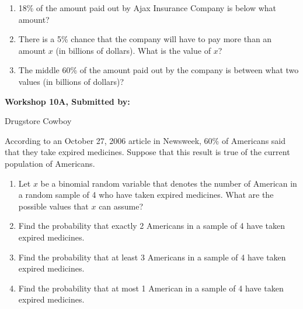 \documentclass[11pt]{book}\usepackage[]{graphicx}\usepackage[]{color}
\begin{document}
\begin{exercises}
\begin{exercise}
\begin{enumerate}
  \item 18\% of the amount paid out by Ajax Insurance Company is below what amount?
  \item There is a 5\% chance that the company will have to pay more than an amount $x$ (in billions of dollars). What is the value of $x$?
  \item The middle 60\% of the amount paid out by the company is between what two values (in billions of dollars)?
\end{enumerate}

\end{exercise}
\begin{solution}  %

\end{solution}

\clearpage

    \begin{exercise}  %

    \begin{center}
\begin{flushleft}\textbf{\large \hfill Workshop 10A, Submitted by: }\end{flushleft}

\end{center}

Drugstore Cowboy

According to an October 27, 2006 article in Newsweek, 60\% of Americans said that they take expired medicines. Suppose that this result is true of the current population of Americans.

\begin{enumerate}
\item Let $x$ be a binomial random variable that denotes the number of American in a random sample of 4 who have taken expired medicines. What are the possible values that $x$ can assume?
\item Find the probability that exactly 2 Americans in a sample of 4 have taken expired medicines.
\item Find the probability that at least 3 Americans in a sample of 4 have taken expired medicines.
\item Find the probability that at most 1 American in a sample of 4 have taken expired medicines.
\end{enumerate}


\end{exercise}
\end{exercises}
\end{document}

